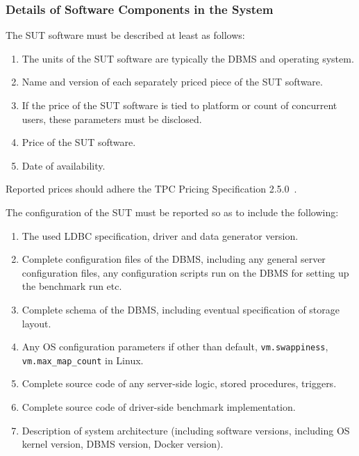 \subsubsection{Details of Software Components in the System}
The SUT software must be described at least as follows:
\begin{enumerate}
    \item The units of the SUT software are typically the DBMS and operating system.
    \item Name and version of each separately priced piece of the SUT software.
    \item If the price of the SUT software is tied to platform or count of concurrent users, these parameters must be disclosed.
    \item Price of the SUT software.
    \item Date of availability.
\end{enumerate}
Reported prices should adhere the TPC Pricing Specification 2.5.0~\cite{pricing,tpc-pricing}.

The configuration of the SUT must be reported so as to include the following:
\begin{enumerate}
    \item The used LDBC specification, driver and data generator version.
    \item Complete configuration files of the DBMS, including any general server configuration files, any configuration scripts run on the DBMS for setting up the benchmark run etc.
    \item Complete schema of the DBMS, including eventual specification of storage layout.
    \item Any OS configuration parameters if other than default, \eg \verb+vm.swappiness+, \verb+vm.max_map_count+ in Linux.
    \item Complete source code of any server-side logic, \eg stored procedures, triggers.
    \item Complete source code of driver-side benchmark implementation.
    \item Description of system architecture (including software versions, including OS kernel version, DBMS version, Docker version).
\end{enumerate}


